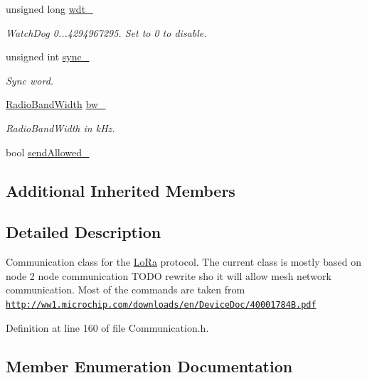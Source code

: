 \begin{DoxyCompactItemize}
unsigned long \hyperlink{classo_cpt_1_1_lo_ra_aef791d801da3a184f574bb5dcf465bd3}{wdt\+\_\+}
\begin{DoxyCompactList}\small\item\em Watch\+Dog 0...4294967295. Set to 0 to disable. \end{DoxyCompactList}\item 
unsigned int \hyperlink{classo_cpt_1_1_lo_ra_a42f093f868ce1b8d4525031569b77c19}{sync\+\_\+}
\begin{DoxyCompactList}\small\item\em Sync word. \end{DoxyCompactList}\item 
\hyperlink{classo_cpt_1_1_lo_ra_a37ef012dc7d97a8825917dc84ddc6f4c}{Radio\+Band\+Width} \hyperlink{classo_cpt_1_1_lo_ra_a687ca4712f0976534dcdaec0b068d9e5}{bw\+\_\+}
\begin{DoxyCompactList}\small\item\em Radio\+Band\+Width in k\+Hz. \end{DoxyCompactList}\item 
bool \hyperlink{classo_cpt_1_1_lo_ra_a40be67af15ddcf86fe017fa356084293}{send\+Allowed\+\_\+}
\end{DoxyCompactItemize}
\subsection*{Additional Inherited Members}


\subsection{Detailed Description}
Communication class for the \hyperlink{classo_cpt_1_1_lo_ra}{Lo\+Ra} protocol. The current class is mostly based on node 2 node communication T\+O\+DO rewrite sho it will allow mesh network communication. Most of the commands are taken from \href{http://ww1.microchip.com/downloads/en/DeviceDoc/40001784B.pdf}{\tt http\+://ww1.\+microchip.\+com/downloads/en/\+Device\+Doc/40001784\+B.\+pdf} 

Definition at line 160 of file Communication.\+h.



\subsection{Member Enumeration Documentation}
\hypertarget{classo_cpt_1_1_lo_ra_abb27d22a584625eea0339906152c031d}{}\label{classo_cpt_1_1_lo_ra_abb27d22a584625eea0339906152c031d} 
